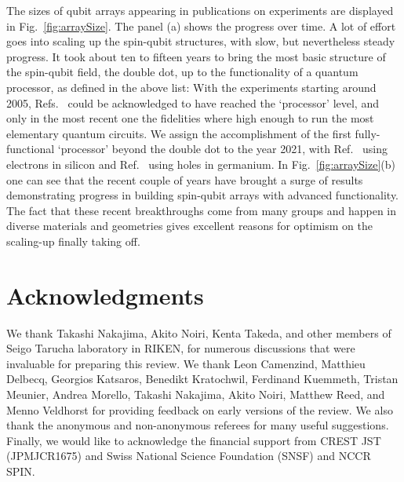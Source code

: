 \documentclass[aps, prx, showpacs, twocolumn, superscriptaddress, notitlepage, longbibliography, floatfix, nofootinbib]{revtex4-2}
\begin{document}
The sizes of qubit arrays appearing in publications on experiments are displayed in Fig.~\ref{fig:arraySize}. The panel (a) shows the progress over time. A lot of effort goes into scaling up the spin-qubit structures, with slow, but nevertheless steady progress.
It took about ten to fifteen years to bring the most basic structure of the spin-qubit field, the double dot, up to the functionality of a quantum processor, as defined in the above list: With the experiments starting \cite{petta_coherent_2005} around 2005, Refs.~\cite{veldhorst_two-qubit_2015,zajac_resonantly_2017,watson_programmable_2018} could be acknowledged to have reached the `processor' level, and only in the most recent one the fidelities where high enough to run the most elementary quantum circuits. We assign the accomplishment of the first fully-functional `processor' beyond the double dot to the year 2021, with Ref.~\cite{takeda_quantum_2021} using electrons in silicon and Ref.~\cite{hendrickx_four-qubit_2021} using holes in germanium. 
In Fig.~\ref{fig:arraySize}(b) one can see that the recent couple of years have brought a surge of results demonstrating progress in building spin-qubit arrays with advanced functionality. The fact that these recent breakthroughs come from many groups and happen in diverse materials and geometries gives excellent reasons for optimism on the scaling-up finally taking off.



\section{Acknowledgments}

We thank Takashi Nakajima, Akito Noiri, Kenta Takeda, and other members of Seigo Tarucha laboratory in RIKEN, for numerous discussions that were invaluable for preparing this review. We thank Leon Camenzind, Matthieu Delbecq, Georgios Katsaros, Benedikt Kratochwil, Ferdinand Kuemmeth, Tristan Meunier, Andrea Morello, Takashi Nakajima,  Akito Noiri, Matthew Reed, and Menno Veldhorst for providing feedback on early versions of the review. We also thank the anonymous and non-anonymous referees for many useful suggestions. Finally, we would like to acknowledge the financial support from CREST JST (JPMJCR1675) and Swiss National Science Foundation (SNSF) and NCCR SPIN.






\fi %

\appendix
\end{document}
